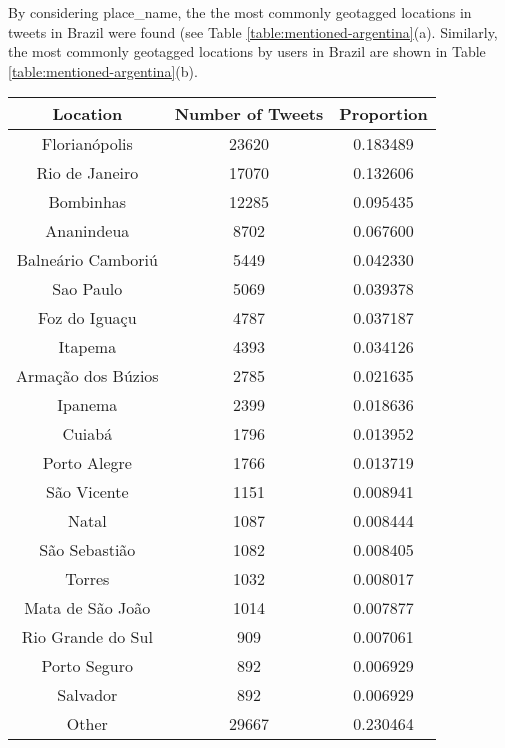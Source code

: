 By considering {\selectfont place\_name}, the the most commonly geotagged locations in tweets in Brazil were found (see Table \ref{table:mentioned-argentina}(a). Similarly, the most commonly geotagged locations by users in Brazil are shown in Table \ref{table:mentioned-argentina}(b).


\begin{table}
\centering
\begin{subtable}[c]{0.5\textwidth}
\centering
    \begin{tabular}{|c|c|c|}
    \hline
    Location & Number of Tweets & Proportion \\
    \hline
    Florianópolis & 23620 & 0.183489 \\
    Rio de Janeiro & 17070 & 0.132606 \\
    Bombinhas & 12285 & 0.095435 \\
    Ananindeua & 8702 & 0.067600 \\
    Balneário Camboriú & 5449 & 0.042330 \\
    Sao Paulo & 5069 & 0.039378 \\
    Foz do Iguaçu & 4787 & 0.037187 \\
    Itapema & 4393 & 0.034126 \\
    Armação dos Búzios & 2785 & 0.021635 \\
    Ipanema & 2399 & 0.018636 \\
    Cuiabá & 1796 & 0.013952 \\
    Porto Alegre & 1766 & 0.013719 \\
    São Vicente & 1151 & 0.008941 \\
    Natal & 1087 & 0.008444 \\
    São Sebastião & 1082 & 0.008405 \\
    Torres & 1032 & 0.008017 \\
    Mata de São João & 1014 & 0.007877 \\
    Rio Grande do Sul & 909 & 0.007061 \\
    Porto Seguro & 892 & 0.006929 \\
    Salvador & 892 & 0.006929 \\
    Other & 29667 & 0.230464 \\
    \hline
    \end{tabular}
\end{subtable}


\end{table}
